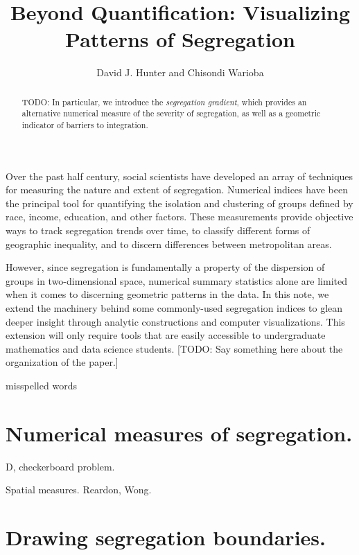 \documentclass{article}
\theoremstyle{theorem}
\theoremstyle{definition}
\begin{document}
\title{Beyond Quantification: Visualizing Patterns of Segregation}
\author{David J. Hunter and Chisondi Warioba}

\maketitle

\begin{abstract}
  TODO: In particular, we introduce the \textit{segregation gradient}, which provides an alternative numerical measure of the severity of segregation, as well as a geometric indicator of barriers to integration.
\end{abstract}

\noindent Over the past half century, social scientists have developed an array of techniques for measuring the nature and extent of segregation. \cite{example1} Numerical indices have been the principal tool for quantifying the isolation and clustering of groups defined by race, income, education, and other factors. These measurements provide objective ways to track segregation trends over time, to classify different forms of geographic inequality, and to discern differences between metropolitan areas.

However, since segregation is fundamentally a property of the dispersion of groups in two-dimensional space, numerical summary statistics alone are limited when it comes to discerning geometric patterns in the data. In this note, we extend the machinery behind some commonly-used segregation indices to glean deeper insight through analytic constructions and computer visualizations. This extension will only require tools that are easily accessible to undergraduate mathematics and data science students.  [TODO: Say something here about the organization of the paper.]

misspelled words

\section{Numerical measures of segregation.}

D, checkerboard problem.

Spatial measures. Reardon, Wong.

\section{Drawing segregation boundaries.}
\end{document}
